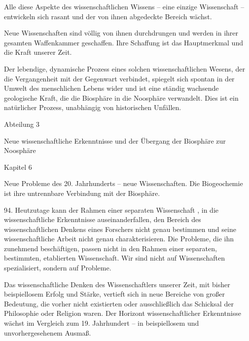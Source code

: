 \documentclass[11pt,a4paper]{book}
\begin{document}
Alle diese Aspekte des wissenschaftlichen Wissens -- eine einzige Wissenschaft -- entwickeln sich rasant und der von ihnen abgedeckte Bereich wächst.



Neue Wissenschaften sind völlig von ihnen durchdrungen und werden in ihrer gesamten Waffenkammer geschaffen. Ihre Schaffung ist das Hauptmerkmal und die Kraft unserer Zeit.



Der lebendige, dynamische Prozess eines solchen wissenschaftlichen Wesens, der die Vergangenheit mit der Gegenwart verbindet, spiegelt sich spontan in der Umwelt des menschlichen Lebens wider und ist eine ständig wachsende geologische Kraft, die die Biosphäre in die Noosphäre verwandelt. Dies ist ein natürlicher Prozess, unabhängig von historischen Unfällen.



 



Abteilung 3

Neue wissenschaftliche Erkenntnisse und der Übergang der Biosphäre zur Noosphäre



 



Kapitel 6



 



Neue Probleme des 20. Jahrhunderts -- neue Wissenschaften. Die Biogeochemie ist ihre untrennbare Verbindung mit der Biosphäre.



 





94. Heutzutage kann der Rahmen einer separaten Wissenschaft , in die wissenschaftliche Erkenntnisse auseinanderfallen, den Bereich des wissenschaftlichen Denkens eines Forschers nicht genau bestimmen und seine wissenschaftliche Arbeit nicht genau charakterisieren. Die Probleme, die ihn zunehmend beschäftigen, passen nicht in den Rahmen einer separaten, bestimmten, etablierten Wissenschaft. Wir sind nicht auf Wissenschaften spezialisiert, sondern auf Probleme.



Das wissenschaftliche Denken des Wissenschaftlers unserer Zeit, mit bisher beispiellosem Erfolg und Stärke, vertieft sich in neue Bereiche von großer Bedeutung, die vorher nicht existierten oder ausschließlich das Schicksal der Philosophie oder Religion waren. Der Horizont wissenschaftlicher Erkenntnisse wächst im Vergleich zum 19. Jahrhundert -- in beispiellosem und unvorhergesehenem Ausmaß.
\end{document}
